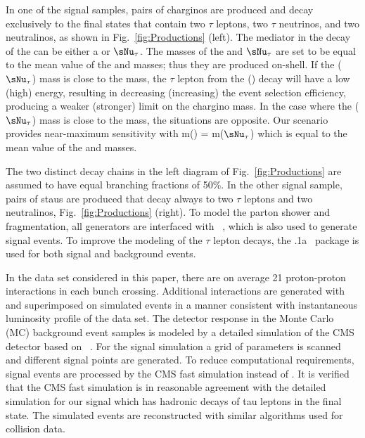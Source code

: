 In one of the signal samples, pairs of charginos are produced and decay exclusively to the final states that contain 
two $\tau$ leptons, two $\tau$ neutrinos, and two neutralinos, as shown in Fig.~\ref{fig:Productions} (left). 
The mediator in the decay of the \chione can be either a \sTau or $\sNu_{\tau}$. 
The masses of the \sTau and $\sNu_{\tau}$ are set to be equal to the mean value of the \chione and \PSGczDo masses; thus they are produced on-shell. 
If the \sTau ($\sNu_{\tau}$) mass is close to the \PSGczDo mass, the $\tau$ lepton from the \sTau (\chione) decay will have a low (high) energy, resulting in decreasing (increasing) the event selection efficiency, producing a weaker (stronger) limit on the chargino mass.
In the case where the \sTau ($\sNu_{\tau}$) mass is close to the \chione mass, the situations are opposite.
Our scenario provides near-maximum sensitivity with m(\sTau) = m($\sNu_{\tau}$) which is equal to the mean value of the \chione and \PSGczDo masses. 

The two distinct decay chains in the left diagram of Fig.~\ref{fig:Productions} 
are assumed to have equal branching fractions of 50\%. 
In the other signal sample, pairs of staus are produced that decay always to two $\tau$ leptons and two neutralinos, Fig.~\ref{fig:Productions} (right). 
To model  the parton shower and fragmentation, all generators are interfaced with ~\cite{Sjostrand:2006za}, 
which is also used to generate signal events. To improve the modeling of the $\tau$ lepton decays, 
 the .1a~\cite{Davidson:2010rw} package is used for both signal and background events. 

In the data set considered in this paper,
there are on average 21 proton-proton interactions in each bunch crossing.
Additional interactions are generated with \PYTHIA and superimposed on simulated events in a manner consistent with 
 instantaneous luminosity profile of the data set.
The detector response in the  Monte Carlo (MC) background event samples is modeled by a
detailed simulation
of the CMS detector based on {\GEANTfour}~\cite{Agostinelli:2002hh}.  
For the signal simulation a grid of parameters is scanned and different signal points are generated. To reduce  computational requirements, signal events 
are processed by the CMS fast simulation \cite{Abdullin:2011zz} instead of {\GEANTfour}. 
It is verified that the CMS fast simulation is in reasonable agreement with the detailed simulation for our signal which has hadronic decays of 
tau leptons in the final state.
The simulated events are reconstructed with similar algorithms used for collision data.

